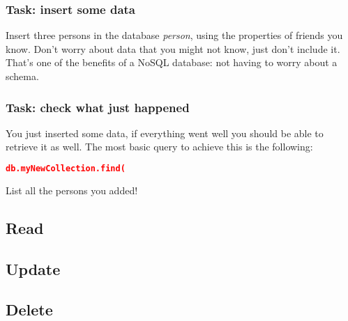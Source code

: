 \documentclass[paper=a4, fontsize=11pt]{scrartcl} %
\numberwithin{equation}{section} %
\numberwithin{figure}{section} %
\numberwithin{table}{section} %
\begin{document}
																							\subsubsection{Task: insert some data}
																							Insert three persons in the database \emph{person}, using the properties of friends you know. Don't worry about data that you might not know, just don't include it. That's one of the benefits of a NoSQL database: not having to worry about a schema.
																						      
																							\subsubsection{Task: check what just happened}
																						      You just inserted some data, if everything went well you should be able to retrieve it as well. The most basic query to achieve this is the following:
																						      \begin{lstlisting}[language=json,firstnumber=1]
																						    db.myNewCollection.find(
																						    \end{lstlisting}
																						  List all the persons you added!
																						
																						
																						  \subsection{Read}
																						
																						  \subsection{Update}
																						
																						  \subsection{Delete}
																						
																						
																						  
\end{document}
